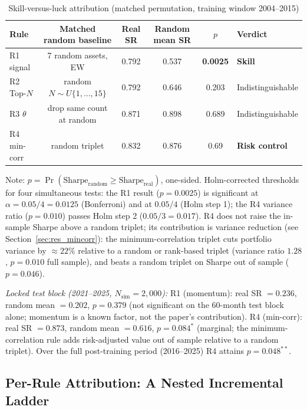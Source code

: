\begin{table}[H]
\centering
\caption{Skill-versus-luck attribution (matched permutation, training window 2004--2015)}
\label{tab:attribution}
\small
\begin{tabular}{lccccl}
\toprule
Rule & Matched random baseline & Real SR & Random mean SR & $p$ & Verdict \\
\midrule
R1 signal     & 7 random assets, EW            & 0.792 & 0.537 & \textbf{0.0025} & \textbf{Skill} \\
R2 Top-$N$    & random $N\sim U\{1,\ldots,15\}$ & 0.792 & 0.646 & 0.203 & Indistinguishable \\
R3 $\theta$   & drop same count at random       & 0.871 & 0.898 & 0.689 & Indistinguishable \\
R4 min-corr   & random triplet                  & 0.832 & 0.876 & 0.69  & \textbf{Risk control} \\
\bottomrule
\end{tabular}
\begin{flushleft}
\footnotesize Note: $p = \Pr(\text{Sharpe}_{\text{random}} \geq \text{Sharpe}_{\text{real}})$,
one-sided. Holm-corrected thresholds for four simultaneous tests: the R1 result
($p = 0.0025$) is significant at $\alpha=0.05/4=0.0125$ (Bonferroni) and at $0.05/4$ (Holm
step 1); the R4 variance ratio ($p = 0.010$) passes Holm step 2 ($0.05/3 = 0.017$).
R4 does not raise the in-sample Sharpe above a random triplet; its contribution is
variance reduction (see Section~\ref{sec:res_mincorr}): the minimum-correlation
triplet cuts portfolio variance by $\approx 22\%$ relative to a random or rank-based
triplet (variance ratio $1.28$, $p = 0.010$ full sample), and beats a random triplet
on Sharpe out of sample ($p = 0.046$).

\smallskip
\emph{Locked test block (2021--2025, $N_{\text{sim}}=2{,}000$):}
R1 (momentum): real SR $= 0.236$, random mean $= 0.202$, $p = 0.379$ (not significant on
the 60-month test block alone; momentum is a known factor, not the paper's contribution).
R4 (min-corr): real SR $= 0.873$, random mean $= 0.616$, $p = 0.084^{*}$ (marginal;
the minimum-correlation rule adds risk-adjusted value out of sample relative to a random
triplet). Over the full post-training period (2016--2025) R4 attains $p = 0.048^{**}$.
\end{flushleft}
\end{table}


\subsection{Per-Rule Attribution: A Nested Incremental Ladder}
\label{sec:res_ladder}

